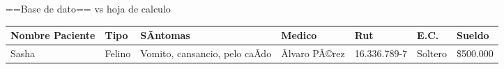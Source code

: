 \documentclass[ignorenonframetext,]{beamer}
\begin{document}
\begin{frame}{==Base de dato== vs hoja de calculo}

\begin{longtable}[c]{@{}lllllll@{}}
\toprule
\begin{minipage}[b]{0.17\columnwidth}\raggedright\strut
Nombre Paciente
\strut\end{minipage} &
\begin{minipage}[b]{0.06\columnwidth}\raggedright\strut
Tipo
\strut\end{minipage} &
\begin{minipage}[b]{0.08\columnwidth}\raggedright\strut
SÃ­ntomas
\strut\end{minipage} &
\begin{minipage}[b]{0.07\columnwidth}\raggedright\strut
Medico
\strut\end{minipage} &
\begin{minipage}[b]{0.06\columnwidth}\raggedright\strut
Rut
\strut\end{minipage} &
\begin{minipage}[b]{0.08\columnwidth}\raggedright\strut
E.C.
\strut\end{minipage} &
\begin{minipage}[b]{0.10\columnwidth}\raggedright\strut
Sueldo
\strut\end{minipage}\tabularnewline
\midrule
\endhead
\begin{minipage}[t]{0.17\columnwidth}\raggedright\strut
Sasha
\strut\end{minipage} &
\begin{minipage}[t]{0.06\columnwidth}\raggedright\strut
Felino
\strut\end{minipage} &
\begin{minipage}[t]{0.08\columnwidth}\raggedright\strut
Vomito, cansancio, pelo caÃ­do
\strut\end{minipage} &
\begin{minipage}[t]{0.07\columnwidth}\raggedright\strut
Ãlvaro PÃ©rez
\strut\end{minipage} &
\begin{minipage}[t]{0.06\columnwidth}\raggedright\strut
16.336.789-7
\strut\end{minipage} &
\begin{minipage}[t]{0.08\columnwidth}\raggedright\strut
Soltero
\strut\end{minipage} &
\begin{minipage}[t]{0.10\columnwidth}\raggedright\strut
\$500.000
\strut\end{minipage}\tabularnewline

\end{longtable}
\end{frame}
\end{document}
